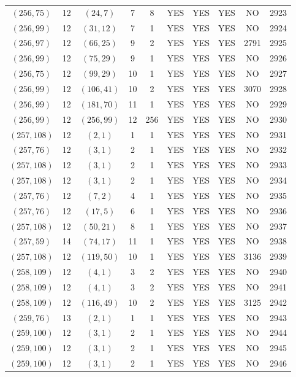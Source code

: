 \begin{longtable}{|c|c|c|c|c|c|c|c|c|c|}
$(256, 75)$ & 12 & $(24, 7)$ & 7 & 8 & YES & YES & YES & NO & 2923\\
$(256, 99)$ & 12 & $(31, 12)$ & 7 & 1 & YES & YES & YES & NO & 2924\\
$(256, 97)$ & 12 & $(66, 25)$ & 9 & 2 & YES & YES & YES & 2791 & 2925\\
$(256, 99)$ & 12 & $(75, 29)$ & 9 & 1 & YES & YES & YES & NO & 2926\\
$(256, 75)$ & 12 & $(99, 29)$ & 10 & 1 & YES & YES & YES & NO & 2927\\
$(256, 99)$ & 12 & $(106, 41)$ & 10 & 2 & YES & YES & YES & 3070 & 2928\\
$(256, 99)$ & 12 & $(181, 70)$ & 11 & 1 & YES & YES & YES & NO & 2929\\
$(256, 99)$ & 12 & $(256, 99)$ & 12 & 256 & YES & YES & YES & NO & 2930\\
$(257, 108)$ & 12 & $(2, 1)$ & 1 & 1 & YES & YES & YES & NO & 2931\\
$(257, 76)$ & 12 & $(3, 1)$ & 2 & 1 & YES & YES & YES & NO & 2932\\
$(257, 108)$ & 12 & $(3, 1)$ & 2 & 1 & YES & YES & YES & NO & 2933\\
$(257, 108)$ & 12 & $(3, 1)$ & 2 & 1 & YES & YES & YES & NO & 2934\\
$(257, 76)$ & 12 & $(7, 2)$ & 4 & 1 & YES & YES & YES & NO & 2935\\
$(257, 76)$ & 12 & $(17, 5)$ & 6 & 1 & YES & YES & YES & NO & 2936\\
$(257, 108)$ & 12 & $(50, 21)$ & 8 & 1 & YES & YES & YES & NO & 2937\\
$(257, 59)$ & 14 & $(74, 17)$ & 11 & 1 & YES & YES & YES & NO & 2938\\
$(257, 108)$ & 12 & $(119, 50)$ & 10 & 1 & YES & YES & YES & 3136 & 2939\\
$(258, 109)$ & 12 & $(4, 1)$ & 3 & 2 & YES & YES & YES & NO & 2940\\
$(258, 109)$ & 12 & $(4, 1)$ & 3 & 2 & YES & YES & YES & NO & 2941\\
$(258, 109)$ & 12 & $(116, 49)$ & 10 & 2 & YES & YES & YES & 3125 & 2942\\
$(259, 76)$ & 13 & $(2, 1)$ & 1 & 1 & YES & YES & YES & NO & 2943\\
$(259, 100)$ & 12 & $(3, 1)$ & 2 & 1 & YES & YES & YES & NO & 2944\\
$(259, 100)$ & 12 & $(3, 1)$ & 2 & 1 & YES & YES & YES & NO & 2945\\
$(259, 100)$ & 12 & $(3, 1)$ & 2 & 1 & YES & YES & YES & NO & 2946\\

\end{longtable}
